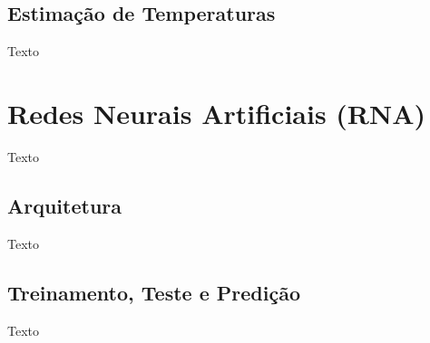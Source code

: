 \documentclass[oneside,openright,12pt]{ufsm_2015} %
\begin{document}
            \subsection{Estimação de Temperaturas}
                \par Texto
        
        \section{Redes Neurais Artificiais (RNA)}
            \par Texto
            
            \subsection{Arquitetura}
                \par Texto
             
            \subsection{Treinamento, Teste e Predição}
                \par Texto
            
\end{document}
